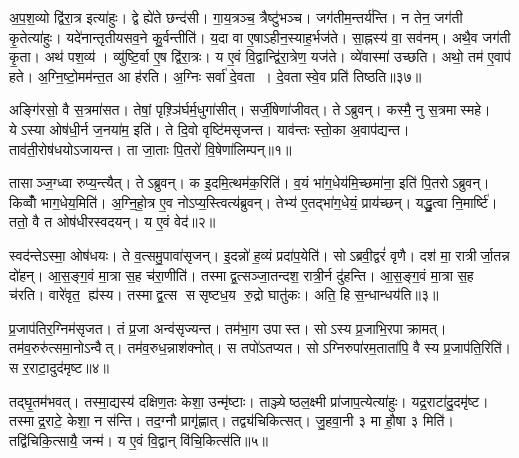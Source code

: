अ॒प॒श॒व्यो द्वि॑रा॒त्र इत्या॑हुः। द्वे ह्ये॑ते छन्द॑सी। गा॒य॒त्रञ्च॒ त्रैष्टु॑भञ्च। जग॑तीम॒न्तर्य॑न्ति। न तेन॒ जग॑ती कृ॒तेत्या॑हुः। यदे॑नान्तृतीयसव॒ने कु॒र्वन्तीति॑। य॒दा वा ए॒षाऽहीन॒स्याह॒र्भज॑ते। सा॒ह्नस्य॑ वा॒ सव॑नम्। अथै॒व जग॑ती कृ॒ता। अथ॑ पश॒व्य॑। व्यु॑ष्टि॒र्वा ए॒ष द्वि॑रा॒त्रः। य ए॒वं वि॒द्वान्द्वि॑रा॒त्रेण॒ यज॑ते। व्ये॑वास्मा॑ उच्छति। अथो॒ तम॑ ए॒वाप॑ हते। अ॒ग्नि॒ष्टो॒मम॑न्त॒त आ ह॑रति। अ॒ग्निः सर्वा॑ दे॒वता। दे॒वतास्वे॒व प्रति॑ तिष्ठति॥३७॥

\clearpage
{}



\setcounter{anuvakam}{0}
अङ्गि॑रसो॒ वै स॒त्रमा॑सत। तेषां॒ पृश़्ञि॑र्घर्म॒धुगा॑सीत्। सर्जी॒षेणा॑जीवत्। तेऽब्रुवन्। कस्मै॒ नु स॒त्रमास्महे। येऽस्या ओष॑धी॒र्न ज॒नया॑म॒ इति॑। ते दि॒वो वृष्टि॑मसृजन्त। याव॑न्तः स्तो॒का अ॒वाप॑द्यन्त। ताव॑ती॒रोष॑धयोऽजायन्त। ता जा॒ताः पि॒तरो॑ वि॒षेणा॑लिम्पन्॥१॥

तासाञ्ज॒ग्ध्वा रुप्य॒न्त्यैत्। तेऽब्रुवन्। क इ॒दमि॒त्थम॑क॒रिति॑। व॒यं भा॑ग॒धेय॑मि॒च्छमा॑ना॒ इति॑ पि॒तरोऽब्रुवन्। किव्वोँ॑ भाग॒धेय॒मिति॑। अ॒ग्नि॒हो॒त्र ए॒व नोऽप्य॒स्त्वित्य॑ब्रुवन्। तेभ्य॑ ए॒तद्भा॑ग॒धेयं॒ प्राय॑च्छन्। यद्धु॒त्वा नि॒मार्ष्टि॑। ततो॒ वै त ओष॑धीरस्वदयन्। य ए॒वं वेद॑॥२॥

स्वद॑न्तेऽस्मा॒ ओष॑धयः। ते व॒त्समु॒पावा॑सृजन्। इ॒दन्नो॑ ह॒व्यं प्रदा॑प॒येति॑। सोऽब्रवी॒द्वरं॑ वृणै। दश॑ मा॒ रात्रीर्जा॒तन्न दो॑हन्। आ॒स॒ङ्ग॒वं मा॒त्रा स॒ह च॑रा॒णीति॑। तस्माद्व॒त्सञ्जा॒तन्दश॒ रात्री॒र्न दु॑हन्ति। आ॒स॒ङ्ग॒वं मा॒त्रा स॒ह च॑रति। वारे॑वृत॒ ह्य॑स्य। तस्माद्व॒त्स ससृष्टध॒य रु॒द्रो घातु॑कः। अति॒ हि स॒न्धान्धय॑ति॥३॥\anuvakamend[अ॒लि॒म्प॒न्वेद॒ घातु॑क॒ एकं च]

प्र॒जाप॑तिर॒ग्निम॑सृजत। तं प्र॒जा अन्व॑सृज्यन्त। तम॑भा॒ग उपास्त। सोऽस्य प्र॒जाभि॒रपाक्रामत्। तम॑व॒रुरु॑त्समा॒नोऽन्वैत्। तम॑व॒रुध॒न्नाश॑क्नोत्। स तपो॑ऽतप्यत। सोऽग्निरुपा॑रम॒ताता॑पि॒ वै स्य प्र॒जाप॑ति॒रिति॑। स र॒राटा॒दुद॑मृष्ट॥४॥

तद्घृ॒तम॑भवत्। तस्मा॒द्यस्य॑ दक्षिण॒तः केशा॒ उन्मृ॑ष्टाः। ताञ्ज्येष्ठल॒क्ष्मी प्रा॑जाप॒त्येत्या॑हुः। यद्र॒राटा॑दु॒दमृ॑ष्ट। तस्माद्र॒राटे॒ केशा॒ न स॑न्ति। तद॒ग्नौ प्रागृ॑ह्णात्। तद्व्य॑चिकित्सत्। जु॒हवा॒नी ३ मा हौ॒षा ३ मिति॑। तद्वि॑चिकि॒त्सायै॒ जन्म॑। य ए॒वं वि॒द्वान् वि॑चि॒कित्स॑ति॥५॥

